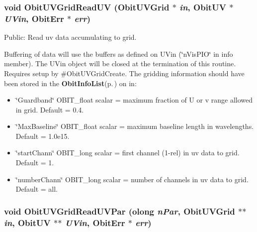 \subsubsection{\setlength{\rightskip}{0pt plus 5cm}void Obit\-UVGrid\-Read\-UV ({\bf Obit\-UVGrid} $\ast$ {\em in}, {\bf Obit\-UV} $\ast$ {\em UVin}, {\bf Obit\-Err} $\ast$ {\em err})}\label{ObitUVGrid_8c_a19}


Public: Read uv data accumulating to grid. 

Buffering of data will use the buffers as defined on UVin (\char`\"{}n\-Vis\-PIO\char`\"{} in info member). The UVin object will be closed at the termination of this routine. Requires setup by \#Obit\-UVGrid\-Create. The gridding information should have been stored in the {\bf Obit\-Info\-List}{\rm (p.\,\pageref{structObitInfoList})} on in: \begin{itemize}
\item \char`\"{}Guardband\char`\"{} OBIT\_\-float scalar = maximum fraction of U or v range allowed in grid. Default = 0.4. \item \char`\"{}Max\-Baseline\char`\"{} OBIT\_\-float scalar = maximum baseline length in wavelengths. Default = 1.0e15. \item \char`\"{}start\-Chann\char`\"{} OBIT\_\-long scalar = first channel (1-rel) in uv data to grid. Default = 1. \item \char`\"{}number\-Chann\char`\"{} OBIT\_\-long scalar = number of channels in uv data to grid. Default = all. 
\end{itemize}
\subsubsection{\setlength{\rightskip}{0pt plus 5cm}void Obit\-UVGrid\-Read\-UVPar ({\bf olong} {\em n\-Par}, {\bf Obit\-UVGrid} $\ast$$\ast$ {\em in}, {\bf Obit\-UV} $\ast$$\ast$ {\em UVin}, {\bf Obit\-Err} $\ast$ {\em err})}\label{ObitUVGrid_8c_a20}


